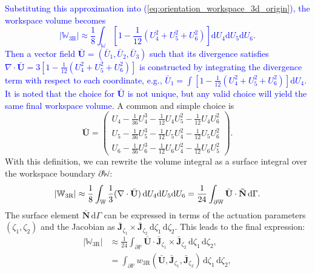 \documentclass[journal]{IEEEtran}
\theoremstyle{definition}
\begin{document}
\textcolor{blue}{Substituting this approximation into (\ref{eq:orientation_workspace_3d_origin}), the workspace volume becomes
\begin{equation}
    \left|\mathbb{W}_\text{3R}\right| \approx \frac{1}{8}\int_\mathbb{W} \left[1 - \frac{1}{12}\left(U_4^2+U_5^2+U_6^2\right)\right] \mathrm{d}U_4\mathrm{d}U_5\mathrm{d}U_6.
\end{equation}
Then a vector field $\bar{\mathbf{U}} = \left(\bar{U}_1, \bar{U}_2, \bar{U}_3\right)$ such that its divergence satisfies $\nabla \cdot \bar{\mathbf{U}} = 3 \left[1 - \frac{1}{12} \left(U_4^2+U_5^2+U_6^2\right) \right]$ is constructed by integrating the divergence term with respect to each coordinate, e.g., $\bar{U}_1 = \int \left[1 - \frac{1}{12} \left(U_4^2+U_5^2+U_6^2\right) \right] \mathrm{d}U_4$. It is noted that the choice for $\bar{\mathbf{U}}$ is not unique, but any valid choice will yield the same final workspace volume.} A common and simple choice is
\begin{equation}
    \bar{\mathbf{U}} = \begin{pmatrix}
         U_4-\frac{1}{36} U_4^3-\frac{1}{12}U_4 U_5^2-\frac{1}{12}U_4U_6^2 \\[1ex] 
         U_5-\frac{1}{36} U_5^3-\frac{1}{12}U_5 U_4^2-\frac{1}{12}U_5U_6^2 \\[1ex]
         U_6-\frac{1}{36} U_6^3-\frac{1}{12}U_6 U_4^2-\frac{1}{12}U_6U_5^2
    \end{pmatrix}.
    \label{eq:orientation_workspace_3d_U}
\end{equation}
With this definition, we can rewrite the volume integral as a surface integral over the workspace boundary $\partial\mathbb{W}$:
\begin{equation}
    \left|\mathbb{W}_\text{3R}\right| \approx \frac{1}{8} \int_\mathbb{W} \frac{1}{3} (\nabla \cdot \bar{\mathbf{U}}) \,\mathrm{d}U_4\mathrm{d}U_5\mathrm{d}U_6 \\
    = \frac{1}{24} \int_{\partial \mathbb{W}} \bar{\mathbf{U}} \cdot \mathbf{\bar{N}} \,\mathrm{d}\Gamma.
\end{equation}
The surface element $\mathbf{\bar{N}}\,\mathrm{d}\Gamma$ can be expressed in terms of the actuation parameters $(\zeta_1, \zeta_2)$ and the Jacobian as $\bar{\mathbf{J}}_{\zeta_1} \times \bar{\mathbf{J}}_{\zeta_2}\,\mathrm{d}\zeta_1\,\mathrm{d}\zeta_2$. This leads to the final expression:
\begin{equation}
  \begin{split}
    \left|\mathbb{W}_\text{3R}\right|&\approx\frac{1}{24}\int_{\partial \mathbb{P}} \bar{\mathbf{U}} \cdot \bar{\mathbf{J}}_{\zeta_1} \times \bar{\mathbf{J}}_{\zeta_2}\,\mathrm{d}\zeta_1\,\mathrm{d}\zeta_2,\\
    &= \int_{\partial \mathbb{P}} w_\text{3R}\left(\bar{\mathbf{U}}, \bar{\mathbf{J}}_{\zeta_1}, \bar{\mathbf{J}}_{\zeta_2}\right) \, \mathrm{d}{\zeta_1} \, \mathrm{d}\zeta_2,
    \label{eq:orientation_workspace_3d}
  \end{split}
\end{equation}
\end{document}

